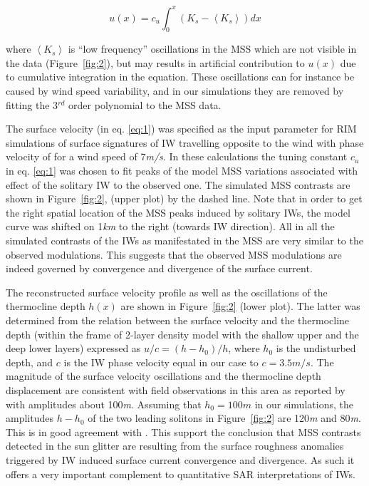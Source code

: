 \documentclass[draft,grl]{agutex}
\begin{document}
\begin{article}
\begin{equation}
u(x) = c_u \int_0^x \left( K_s - \left\langle K_s \right\rangle \right) dx
\label{eq:1}
\end{equation}

\noindent where $\left\langle K_s \right\rangle$ is ``low frequency'' oscillations in the MSS which are not visible in the data (Figure~\ref{fig:2}), but may results in artificial contribution to $u(x)$ due to cumulative integration in the equation.  These oscillations can for instance be caused by wind speed variability, and in our simulations they are removed by fitting the 3${}^{rd}$ order polynomial to the MSS data.  

The surface velocity (in eq. \eqref{eq:1}) was specified as the input parameter for RIM simulations of surface signatures of IW travelling opposite to the wind with phase velocity of  for a wind speed of 7\textit{m/s}. In these calculations the tuning constant $c_u$ in eq. \eqref{eq:1} was chosen to fit peaks of the model MSS variations associated with effect of the solitary IW to the observed one. The simulated MSS contrasts are shown in Figure~\ref{fig:2}, (upper plot) by the dashed line. Note that in order to get the right spatial location of the MSS peaks induced by solitary IWs, the model curve was shifted on 1\textit{km} to the right (towards IW direction). All in all the simulated contrasts of the IWs as manifestated in the MSS are very similar to the observed modulations. This suggests that the observed MSS modulations are indeed governed by convergence and divergence of the surface current.

The reconstructed surface velocity profile as well as the oscillations of the thermocline depth $h(x)$ are shown in Figure~\ref{fig:2} (lower plot). The latter was determined from the relation between the surface velocity and the thermocline depth (within the frame of 2-layer density model with the shallow upper and the deep lower layers) expressed as $u/c = \left( h-h_0 \right) / h $, where $h_0$ is the undisturbed depth, and $c$ is the IW phase velocity equal in our case to $c=3.5m/s$. The magnitude of the surface velocity oscillations and the thermocline depth displacement are consistent with field observations in this area as reported by \cite{Dulov1986} with amplitudes about 100\textit{m}. Assuming that $h_0 = 100m$ in our simulations, the amplitudes $h-h_0$ of the two leading solitons in Figure~\ref{fig:2} are 120\textit{m} and 80\textit{m}. This is in good agreement with \citep{Dulov1986}. This support the conclusion that MSS contrasts detected in the sun glitter are resulting from the surface roughness anomalies triggered by IW induced surface current convergence and divergence. As such it offers a very important complement to quantitative SAR interpretations of IWs.



\end{article}
\end{document}
